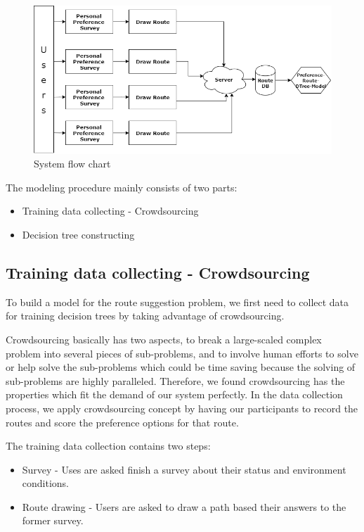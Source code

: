 \documentclass{sigchi}
\begin{document}
\begin{figure}[!h]
\centering
\includegraphics[width=1.0\columnwidth]{pics/work-flow.png}
\caption{System flow chart}
\label{fig:systemflow}
\end{figure}

The modeling procedure mainly consists of two parts:
\begin{itemize}
\item Training data collecting - Crowdsourcing
\item Decision tree constructing
\end{itemize}

\subsection{Training data collecting - Crowdsourcing}

To build a model for the route suggestion problem, we first need to collect data for training decision trees by taking advantage of crowdsourcing.


Crowdsourcing basically has two aspects, to break a large-scaled complex problem into several pieces of sub-problems, and to involve human efforts to solve or help solve the sub-problems which could be time saving because the solving of sub-problems are highly paralleled. Therefore, we found crowdsourcing has the properties which fit the demand of our system perfectly. In the data collection process, we apply crowdsourcing concept by having our participants to record the routes and score the preference options for that route.


The training data collection contains two steps:
\begin{itemize}
\item Survey - Uses are asked finish a survey about their status and environment conditions.
\item Route drawing - Users are asked to draw a path based their answers to the former survey.
\end{itemize}
\end{document}
